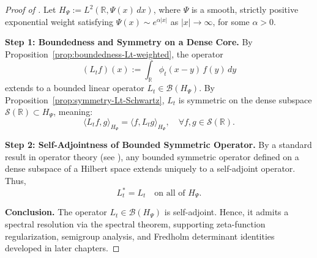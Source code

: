 \begin{proof}[Proof of ]
Let \( H_\Psi := L^2(\mathbb{R}, \Psi(x)\, dx) \), where \( \Psi \) is a smooth, strictly positive exponential weight satisfying \( \Psi(x) \sim e^{\alpha|x|} \) as \( |x| \to \infty \), for some \( \alpha > 0 \).

\medskip
\noindent\textbf{Step 1: Boundedness and Symmetry on a Dense Core.}
By Proposition~\ref{prop:boundedness-Lt-weighted}, the operator
\[
(L_t f)(x) := \int_{\mathbb{R}} \phi_t(x - y)\, f(y)\, dy
\]
extends to a bounded linear operator \( L_t \in \mathcal{B}(H_\Psi) \). By Proposition~\ref{prop:symmetry-Lt-Schwartz}, \( L_t \) is symmetric on the dense subspace \( \mathcal{S}(\mathbb{R}) \subset H_\Psi \), meaning:
\[
\langle L_t f, g \rangle_{H_\Psi} = \langle f, L_t g \rangle_{H_\Psi}, \quad \forall f, g \in \mathcal{S}(\mathbb{R}).
\]

\medskip
\noindent\textbf{Step 2: Self-Adjointness of Bounded Symmetric Operator.}
By a standard result in operator theory (see \cite[Theorem~VI.1]{ReedSimon1980I}), any bounded symmetric operator defined on a dense subspace of a Hilbert space extends uniquely to a self-adjoint operator. Thus,
\[
L_t^* = L_t \quad \text{on all of } H_\Psi.
\]

\medskip
\noindent\textbf{Conclusion.}
The operator \( L_t \in \mathcal{B}(H_\Psi) \) is self-adjoint. Hence, it admits a spectral resolution via the spectral theorem, supporting zeta-function regularization, semigroup analysis, and Fredholm determinant identities developed in later chapters.
\end{proof}
